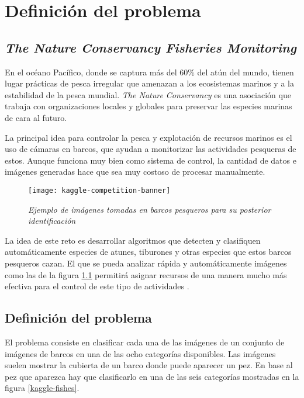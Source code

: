 
\chapter{Definición del problema}

\label{Chapter5} %

\section{\textit{The Nature Conservancy Fisheries Monitoring }}

En el océano Pacífico, donde se captura más del 60\% del atún del mundo, tienen
lugar prácticas de pesca irregular que amenazan a los ecosistemas marinos y a
la estabilidad de la pesca mundial. \textit{The Nature Conservancy} es una
asociación que trabaja con organizaciones locales y globales para preservar las
especies marinas de cara al futuro.

La principal idea para controlar la pesca y explotación de recursos marinos es
el uso de cámaras en barcos, que ayudan a monitorizar las actividades pesqueras
de estos. Aunque funciona muy bien como sistema de control, la cantidad de
datos e imágenes generadas hace que sea muy costoso de procesar manualmente.

\begin{figure}
  \centering
  \caption{\textit{Ejemplo de imágenes tomadas en barcos pesqueros para su posterior identificación}}
\label{kaggle-banner}
  \texttt{[image: kaggle-competition-banner]}
\end{figure}

La idea de este reto es desarrollar algoritmos que detecten y clasifiquen
automáticamente especies de atunes, tiburones y otras especies que estos barcos
pesqueros cazan. El que se pueda analizar rápida y automáticamente imágenes
como las de la figura \ref{kaggle-banner} permitirá asignar recursos de una
manera mucho más efectiva para el control de este tipo de actividades
\parencite{kaggle-page}.

\section{Definición del problema}

El problema consiste en clasificar cada una de las imágenes de un conjunto de
imágenes de barcos en una de las ocho categorías disponibles. Las imágenes
suelen mostrar la cubierta de un barco donde puede aparecer un pez. En base al
pez que aparezca hay que clasificarlo en una de las seis categorías mostradas
en la figura \ref{kaggle-fishes}.

